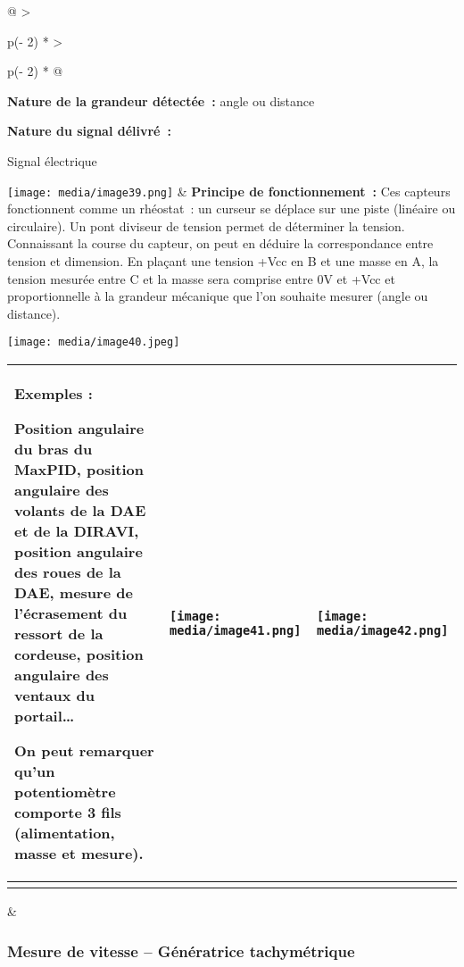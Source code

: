 \documentclass[
]{article}
\begin{document}
\begin{longtable}[]{@{}
  >{\raggedright\arraybackslash}p{(\columnwidth - 2\tabcolsep) * }
  >{\raggedright\arraybackslash}p{(\columnwidth - 2\tabcolsep) * }@{}}
\toprule
\textbf{Nature de la grandeur détectée~:} angle ou distance

\textbf{Nature du signal délivré~:}

Signal électrique

\texttt{[image: media/image39.png]} &
\textbf{Principe de fonctionnement~:} Ces capteurs fonctionnent comme un
rhéostat~: un curseur se déplace sur une piste (linéaire ou circulaire).
Un pont diviseur de tension permet de déterminer la tension. Connaissant
la course du capteur, on peut en déduire la correspondance entre tension
et dimension. En plaçant une tension +Vcc en B et une masse en A, la
tension mesurée entre C et la masse sera comprise entre 0V et +Vcc et
proportionnelle à la grandeur mécanique que l'on souhaite mesurer (angle
ou distance).

\texttt{[image: media/image40.jpeg]} \\
\midrule
\endhead
\begin{minipage}[t]{\linewidth}\raggedright
\begin{longtable}[]{@{}
  >{\raggedright\arraybackslash}p{}
  >{\raggedright\arraybackslash}p{}
  >{\raggedright\arraybackslash}p{}@{}}
\toprule
\textbf{Exemples :}

Position angulaire du bras du MaxPID, position angulaire des volants de
la DAE et de la DIRAVI, position angulaire des roues de la DAE, mesure
de l'écrasement du ressort de la cordeuse, position angulaire des
ventaux du portail\ldots{}

On peut remarquer qu'un potentiomètre comporte 3 fils (alimentation,
masse et mesure). &
\texttt{[image: media/image41.png]} &
\texttt{[image: media/image42.png]} \\
\midrule
\endhead
& & \\
\bottomrule
\end{longtable}
\end{minipage} & \\
\bottomrule
\end{longtable}

\hypertarget{mesure-de-vitesse-guxe9nuxe9ratrice-tachymuxe9trique}{%
\subsubsection{Mesure de vitesse -- Génératrice
tachymétrique}\label{mesure-de-vitesse-guxe9nuxe9ratrice-tachymuxe9trique}}
\end{document}
